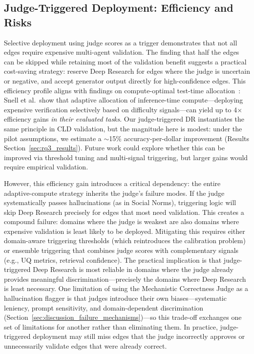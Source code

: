\subsection{Judge-Triggered Deployment: Efficiency and Risks}

Selective deployment using judge scores as a trigger demonstrates that not all edges require expensive multi-agent validation. The finding that half the edges can be skipped while retaining most of the validation benefit suggests a practical cost-saving strategy: reserve Deep Research for edges where the judge is uncertain or negative, and accept generator output directly for high-confidence edges. This efficiency profile aligns with findings on compute-optimal test-time allocation~\citep{snell2024scalingllmtesttimecompute}: Snell et al.\ show that adaptive allocation of inference-time compute---deploying expensive verification selectively based on difficulty signals---can yield up to 4$\times$ efficiency gains \emph{in their evaluated tasks}. Our judge-triggered DR instantiates the same principle in CLD validation, but the magnitude here is modest: under the pilot assumptions, we estimate a $\sim$15\% accuracy-per-dollar improvement (Results Section~\ref{sec:rq3_results}). Future work could explore whether this can be improved via threshold tuning and multi-signal triggering, but larger gains would require empirical validation.

However, this efficiency gain introduces a critical dependency: the entire adaptive-compute strategy inherits the judge's failure modes. If the judge systematically passes hallucinations (as in Social Norms), triggering logic will skip Deep Research precisely for edges that most need validation. This creates a compound failure: domains where the judge is weakest are also domains where expensive validation is least likely to be deployed. Mitigating this requires either domain-aware triggering thresholds (which reintroduces the calibration problem) or ensemble triggering that combines judge scores with complementary signals (e.g., UQ metrics, retrieval confidence). The practical implication is that judge-triggered Deep Research is most reliable in domains where the judge already provides meaningful discrimination---precisely the domains where Deep Research is least necessary. One limitation of using the Mechanistic Correctness Judge as a hallucination flagger is that judges introduce their own biases---systematic leniency, prompt sensitivity, and domain-dependent discrimination (Section~\ref{sec:discussion_failure_mechanisms})---so this trade-off exchanges one set of limitations for another rather than eliminating them. In practice, judge-triggered deployment may still miss edges that the judge incorrectly approves or unnecessarily validate edges that were already correct.

